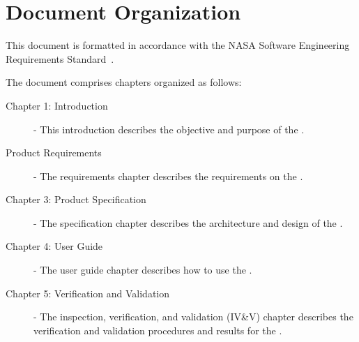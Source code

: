 \section{Document Organization}
This document is formatted in accordance with the 
NASA Software Engineering Requirements Standard~\cite{NASA:SWE}.

The document comprises chapters organized as follows:

\begin{description}

\item[Chapter 1: Introduction] -
This introduction describes the objective and purpose of the \MODELTITLE.

\item[Product Requirements] -
The requirements chapter describes the requirements on the \MODELTITLE.

\item[Chapter 3: Product Specification] - 
The specification chapter describes
the architecture and design of the \MODELTITLE.

\item[Chapter 4: User Guide] - 
The user guide chapter describes how to use the \MODELTITLE.

\item[Chapter 5: Verification and Validation] -  
The inspection, verification, and validation (IV\&V) chapter describes
the verification and validation procedures and results for the \MODELTITLE.

\end{description}
